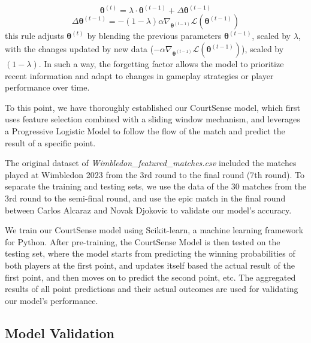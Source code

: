 \documentclass[12pt]{article}  %
\begin{document}
\[
\mathbf{\theta}^{(t)} = \lambda \cdot \mathbf{\theta}^{(t-1)} +  \Delta\mathbf{\theta}^{(t-1)}
\]
\[ 
\Delta\mathbf{\theta}^{(t-1)} = - (1 - \lambda) \alpha \nabla_{\mathbf{\theta}^{(t-1)}} \mathcal{L}(\mathbf{\theta}^{(t-1)})
\]
this rule adjusts $\mathbf{\theta}^{(t)}$ by blending the previous parameters  \( \mathbf{\theta}^{(t-1)} \), scaled by \( \lambda \), with the changes updated by new data (\( - \alpha \nabla_{\mathbf{\theta}^{(t-1)}} \mathcal{L}(\mathbf{\theta}^{(t-1)}) \)), scaled by $ (1 - \lambda) $. In such a way, the forgetting factor allows the model to prioritize recent information and adapt to changes in gameplay strategies or player performance over time.

To this point, we have thoroughly established our CourtSense model, which first uses feature selection combined with a sliding window mechanism, and leverages a Progressive Logistic Model to follow the flow of the match and predict the result of a specific point. 

The original dataset of \textit{Wimbledon\_featured\_matches.csv} included the matches played at Wimbledon 2023 from the 3rd round to the final round (7th round). To separate the training and testing sets, we use the data of the 30 matches from the 3rd round to the semi-final round, and use the epic match in the final round between Carlos Alcaraz and Novak Djokovic to validate our model's accuracy.

We train our CourtSense model using Scikit-learn, a machine learning framework for Python. After pre-training, the CourtSense Model is then tested on the testing set, where the model starts from predicting the winning probabilities of both players at the first point, and updates itself based the actual result of the first point, and then moves on to predict the second point, etc. The aggregated results of all point predictions and their actual outcomes are used for validating our model's performance.

\subsection{Model Validation}
\end{document}
